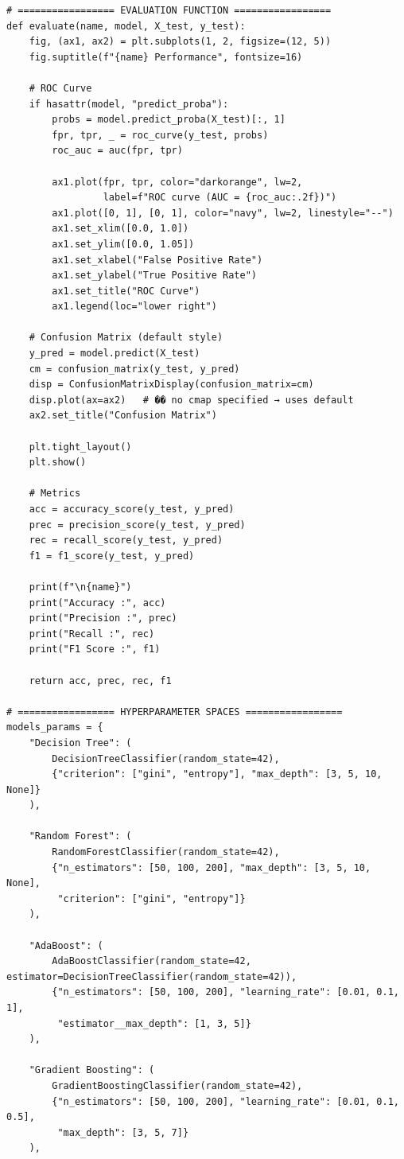 \documentclass[12pt,a4paper]{article}
\begin{document}
\begin{lstlisting}[style=python]
# ================= EVALUATION FUNCTION =================
def evaluate(name, model, X_test, y_test):
    fig, (ax1, ax2) = plt.subplots(1, 2, figsize=(12, 5))
    fig.suptitle(f"{name} Performance", fontsize=16)

    # ROC Curve
    if hasattr(model, "predict_proba"):
        probs = model.predict_proba(X_test)[:, 1]
        fpr, tpr, _ = roc_curve(y_test, probs)
        roc_auc = auc(fpr, tpr)

        ax1.plot(fpr, tpr, color="darkorange", lw=2,
                 label=f"ROC curve (AUC = {roc_auc:.2f})")
        ax1.plot([0, 1], [0, 1], color="navy", lw=2, linestyle="--")
        ax1.set_xlim([0.0, 1.0])
        ax1.set_ylim([0.0, 1.05])
        ax1.set_xlabel("False Positive Rate")
        ax1.set_ylabel("True Positive Rate")
        ax1.set_title("ROC Curve")
        ax1.legend(loc="lower right")

    # Confusion Matrix (default style)
    y_pred = model.predict(X_test)
    cm = confusion_matrix(y_test, y_pred)
    disp = ConfusionMatrixDisplay(confusion_matrix=cm)
    disp.plot(ax=ax2)   # �� no cmap specified → uses default
    ax2.set_title("Confusion Matrix")

    plt.tight_layout()
    plt.show()

    # Metrics
    acc = accuracy_score(y_test, y_pred)
    prec = precision_score(y_test, y_pred)
    rec = recall_score(y_test, y_pred)
    f1 = f1_score(y_test, y_pred)

    print(f"\n{name}")
    print("Accuracy :", acc)
    print("Precision :", prec)
    print("Recall :", rec)
    print("F1 Score :", f1)

    return acc, prec, rec, f1

# ================= HYPERPARAMETER SPACES =================
models_params = {
    "Decision Tree": (
        DecisionTreeClassifier(random_state=42),
        {"criterion": ["gini", "entropy"], "max_depth": [3, 5, 10, None]}
    ),

    "Random Forest": (
        RandomForestClassifier(random_state=42),
        {"n_estimators": [50, 100, 200], "max_depth": [3, 5, 10, None],
         "criterion": ["gini", "entropy"]}
    ),

    "AdaBoost": (
        AdaBoostClassifier(random_state=42, estimator=DecisionTreeClassifier(random_state=42)),
        {"n_estimators": [50, 100, 200], "learning_rate": [0.01, 0.1, 1],
         "estimator__max_depth": [1, 3, 5]}
    ),

    "Gradient Boosting": (
        GradientBoostingClassifier(random_state=42),
        {"n_estimators": [50, 100, 200], "learning_rate": [0.01, 0.1, 0.5],
         "max_depth": [3, 5, 7]}
    ),


\end{lstlisting}
\end{document}
